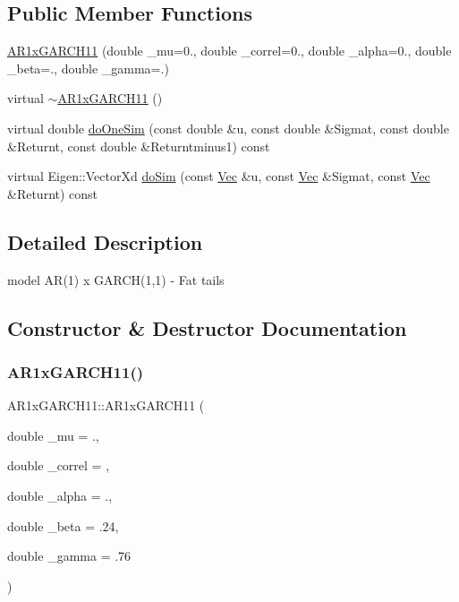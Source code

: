 \subsection*{Public Member Functions}
\begin{DoxyCompactItemize}
\item 
\hyperlink{classAR1xGARCH11_a898a633f6b9355bf3ccc37ba474db360}{A\+R1x\+G\+A\+R\+C\+H11} (double \+\_\+mu=0., double \+\_\+correl=0., double \+\_\+alpha=0., double \+\_\+beta=., double \+\_\+gamma=.)
\item 
virtual \hyperlink{classAR1xGARCH11_acac929ce4afd12e7b0361d2e19b74fe0}{$\sim$\+A\+R1x\+G\+A\+R\+C\+H11} ()
\item 
virtual double \hyperlink{classAR1xGARCH11_ac30812d6e8339c48abcd5c0ce8ea0081}{do\+One\+Sim} (const double \&u, const double \&Sigmat, const double \&Returnt, const double \&Returntminus1) const
\item 
virtual Eigen\+::\+Vector\+Xd \hyperlink{classAR1xGARCH11_ac97f026cefd0e8bca4bbc31100f945d7}{do\+Sim} (const \hyperlink{compute__returns__eigen_8h_a1eb6a9306ef406d7975f3cbf2e247777}{Vec} \&u, const \hyperlink{compute__returns__eigen_8h_a1eb6a9306ef406d7975f3cbf2e247777}{Vec} \&Sigmat, const \hyperlink{compute__returns__eigen_8h_a1eb6a9306ef406d7975f3cbf2e247777}{Vec} \&Returnt) const
\end{DoxyCompactItemize}


\subsection{Detailed Description}
model A\+R(1) x G\+A\+R\+C\+H(1,1) -\/ Fat tails 

\subsection{Constructor \& Destructor Documentation}
\hypertarget{classAR1xGARCH11_a898a633f6b9355bf3ccc37ba474db360}{}\label{classAR1xGARCH11_a898a633f6b9355bf3ccc37ba474db360} 
\subsubsection{\texorpdfstring{A\+R1x\+G\+A\+R\+C\+H11()}{AR1xGARCH11()}}
{\footnotesize\ttfamily A\+R1x\+G\+A\+R\+C\+H11\+::\+A\+R1x\+G\+A\+R\+C\+H11 (\begin{DoxyParamCaption}\item[{double}]{\+\_\+mu = {.},  }\item[{double}]{\+\_\+correl = {},  }\item[{double}]{\+\_\+alpha = {.},  }\item[{double}]{\+\_\+beta = {\ttfamily .24},  }\item[{double}]{\+\_\+gamma = {\ttfamily .76} }\end{DoxyParamCaption})}


